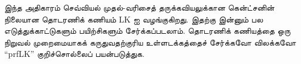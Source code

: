 \documentclass[../../../include/open-logic-chapter]{subfiles}
\begin{document}
      {}
      {}

\begin{editorial}
  இந்த அதிகாரம் செவ்வியல் முதல்-வரிசைத் தருக்கவியலுக்கான கென்ட்சனின்
  நிலையான தொடரணிக் கணியம் LK ஐ வழங்குகிறது. இதற்கு இன்னும் பல
  எடுத்துக்காட்டுகளும் பயிற்சிகளும் சேர்க்கப்படலாம். தொடரணிக் கணியத்தை ஒரு
  நிறுவல் முறைமையாகக் கருதுவதற்குரிய உள்ளடக்கத்தைச் சேர்க்கவோ விலக்கவோ
  ``prfLK'' குறிச்சொல்லைப் பயன்படுத்துக.
\end{editorial}














\OLEndChapterHook
\end{document}
